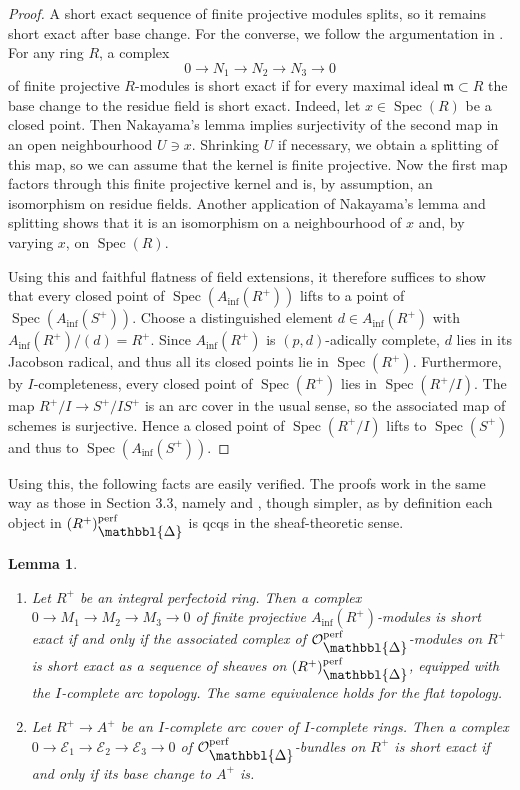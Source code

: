\documentclass[10pt,twoside]{article}
\numberwithin{equation}{section}
\theoremstyle{plain}
\newtheorem{mylemma}[mythm]{Lemma}
\theoremstyle{definition}
\DeclareMathOperator{\Spec}{Spec}
\newcommand{\MCE}{\mathcal{E}}
\newcommand{\MCO}{\mathcal{O}}
\newcommand{\mfm}{\mathfrak{m}}
\DeclareMathOperator{\perf}{perf}
\newcommand{\Prism}{{\mathlarger{\mathbbl{\Delta}}}}
\DeclareMathOperator{\Inf}{inf}
\newcommand{\Ainf}{A_{\Inf}}
\newcommand{\OpP}{\MCO^{\perf}_{\Prism}}
\begin{document}
\begin{proof}
A short exact sequence of finite projective modules splits, so it remains short exact after base change. For the converse, we follow the argumentation in \cite[Lemma 2.3.6]{PR}.
For any ring \(R\), a complex 
\[0\longrightarrow N_1\longrightarrow N_2\longrightarrow N_3\longrightarrow0\]
of finite projective \(R\)-modules is short exact if for every maximal ideal \(\mfm\subset R\) the base change to the residue field is short exact. Indeed, let \(x\in \Spec(R)\) be a closed point. Then Nakayama's lemma implies surjectivity of the second map in an open neighbourhood \(U\ni x\). Shrinking \(U\) if necessary, we obtain a splitting of this map, so we can assume that the kernel is finite projective. Now the first map factors through this finite projective kernel and is, by assumption, an isomorphism on residue fields. Another application of Nakayama's lemma and splitting shows that it is an isomorphism on a neighbourhood of \(x\) and, by varying \(x\), on \(\Spec(R)\).\par
Using this and faithful flatness of field extensions, it therefore suffices to show that every closed point of \(\Spec(\Ainf(R^+))\) lifts to a point of \(\Spec(\Ainf(S^+))\). Choose a distinguished element \(d\in\Ainf(R^+)\) with \(\Ainf(R^+)/(d)=R^+\). Since \(\Ainf(R^+)\) is \((p,d)\)-adically complete, \(d\) lies in its Jacobson radical, and thus all its closed points lie in \(\Spec(R^+)\). Furthermore, by \(I\)-completeness, every closed point of \(\Spec(R^+)\) lies in \(\Spec(R^+/I)\). The map \(R^+/I\to S^+/IS^+\) is an arc cover in the usual sense, so the associated map of schemes is surjective. Hence a closed point of \(\Spec(R^+/I)\) lifts to \(\Spec(S^+)\) and thus to \(\Spec(\Ainf(S^+))\).
\end{proof}

Using this, the following facts are easily verified. The proofs work in the same way as those in Section 3.3, namely  and , though simpler, as by definition each object in \((R^+)_{\Prism}^{\perf}\) is qcqs in the sheaf-theoretic sense.

\begin{mylemma}\label{exactnessArcLocallyGeneral}
    \begin{enumerate}
        \item Let \(R^+\) be an integral perfectoid ring. Then a complex \(0\to M_1\to M_2\to M_3\to0\) of finite projective \(\Ainf(R^+)\)-modules is short exact if and only if the associated complex of \(\OpP\)-modules on \(R^+\) is short exact as a sequence of sheaves on \((R^+)_{\Prism}^{\perf}\), equipped with the \(I\)-complete arc topology. The same equivalence holds for the flat topology.
        \item Let \(R^+\to A^+\) be an \(I\)-complete arc cover of \(I\)-complete rings. Then a complex \(0\to\MCE_1\to\MCE_2\to\MCE_3\to0\) of \(\OpP\)-bundles on \(R^+\) is short exact if and only if its base change to \(A^+\) is.
    \end{enumerate}
    \end{mylemma}
\end{document}
